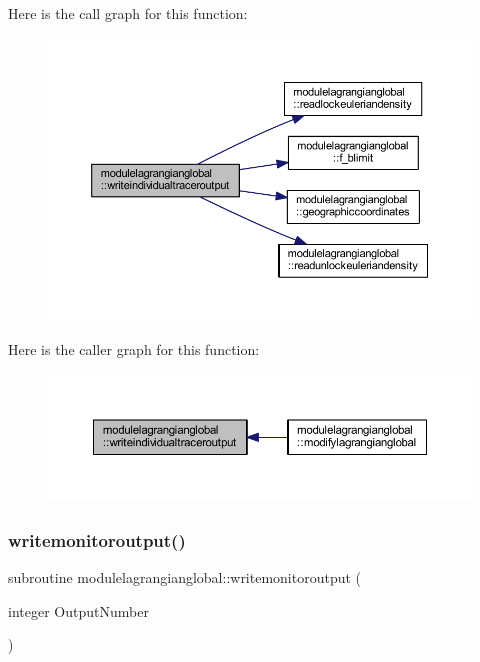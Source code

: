 Here is the call graph for this function\+:\nopagebreak
\begin{figure}[H]
\begin{center}
\leavevmode
\includegraphics[width=350pt]{namespacemodulelagrangianglobal_adbd561b298718cf3849462a24cca974e_cgraph}
\end{center}
\end{figure}
Here is the caller graph for this function\+:\nopagebreak
\begin{figure}[H]
\begin{center}
\leavevmode
\includegraphics[width=350pt]{namespacemodulelagrangianglobal_adbd561b298718cf3849462a24cca974e_icgraph}
\end{center}
\end{figure}
\mbox{\label{namespacemodulelagrangianglobal_ab46abe813f09e4d8299d7750b21814d7}} 
\subsubsection{\texorpdfstring{writemonitoroutput()}{writemonitoroutput()}}
{\footnotesize\ttfamily subroutine modulelagrangianglobal\+::writemonitoroutput (\begin{DoxyParamCaption}\item[{integer}]{Output\+Number }\end{DoxyParamCaption})\hspace{0.3cm}{\ttfamily [private]}}

